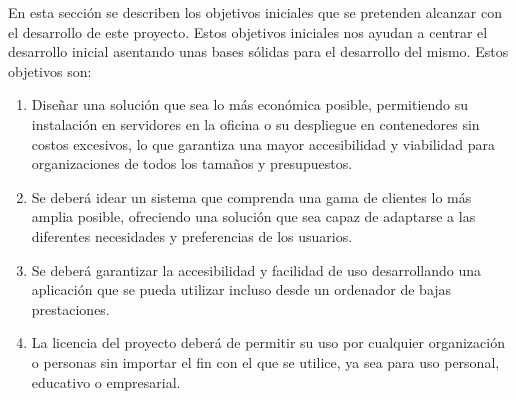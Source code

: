En esta sección se describen los objetivos iniciales que se pretenden alcanzar con el desarrollo de este proyecto. Estos objetivos iniciales nos ayudan a centrar el desarrollo inicial asentando unas bases sólidas para el desarrollo del mismo. Estos objetivos son:

\begin{enumerate}
    \item Diseñar una solución que sea lo más económica posible, permitiendo su instalación en servidores en la oficina o su despliegue en contenedores sin costos excesivos, lo que garantiza una mayor accesibilidad y viabilidad para organizaciones de todos los tamaños y presupuestos.
    \item Se deberá idear un sistema que comprenda una gama de clientes lo más amplia posible, ofreciendo una solución que sea capaz de adaptarse a las diferentes necesidades y preferencias de los usuarios.
    \item Se deberá garantizar la accesibilidad y facilidad de uso desarrollando una aplicación que se pueda utilizar incluso desde un ordenador de bajas prestaciones.
    \item La licencia del proyecto deberá de permitir su uso por cualquier organización o personas sin importar el fin con el que se utilice, ya sea para uso personal, educativo o empresarial.
\end{enumerate}